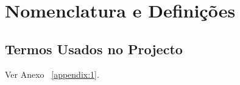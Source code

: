 \section{Nomenclatura e Definições}
\subsection{Termos Usados no Projecto}

Ver Anexo ~\ref{appendix:1}.
